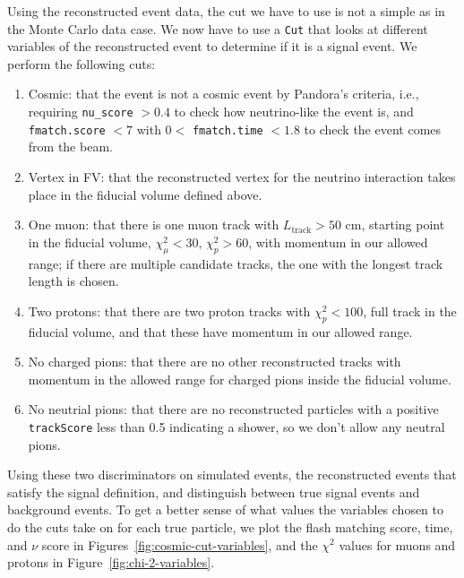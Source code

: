 \documentclass{article}
\begin{document}
Using the reconstructed event data, the cut we have to use is not a simple as in the Monte Carlo data case. 
We now have to use a \verb|Cut| that looks at different variables of the reconstructed event to determine if 
it is a signal event. We perform the following cuts:
\begin{enumerate}[label=(\roman*)]
    \item Cosmic: that the event is not a cosmic event by Pandora's criteria, i.e., requiring \verb|nu_score| $> 0.4$ to 
    check how neutrino-like the event is, and \verb|fmatch.score| $< 7$ with $0 <$ \verb|fmatch.time| $< 1.8$ to check the event comes from the beam.
    \item Vertex in FV\@: that the reconstructed vertex for the neutrino interaction takes place in the fiducial volume defined above.
    \item One muon: that there is one muon track with $L_{\text{track}} > 50$ cm, starting point in the fiducial volume, $\chi^2_\mu < 30$, $\chi^2_p > 60$, with momentum in our allowed range; if
    there are multiple candidate tracks, the one with the longest track length is chosen.
    \item Two protons: that there are two proton tracks with $\chi^2_p < 100$, full track in the fiducial volume, and that these have momentum in our allowed range.
    \item No charged pions: that there are no other reconstructed tracks with momentum in the allowed range for charged pions inside the fiducial volume.
    \item No neutrial pions: that there are no reconstructed particles with a positive \verb|trackScore| less than 0.5 indicating a shower, so we don't allow any neutral pions.
\end{enumerate}
Using these two discriminators on simulated events, the reconstructed events that satisfy the signal definition, and distinguish between true signal events and background events.
To get a better sense of what values the variables chosen to do the cuts take on for each true particle, we plot
the flash matching score, time, and $\nu$ score in Figures~\ref{fig:cosmic-cut-variables}, and the $\chi^2$ values for muons and protons in Figure~\ref{fig:chi-2-variables}.
\end{document}
